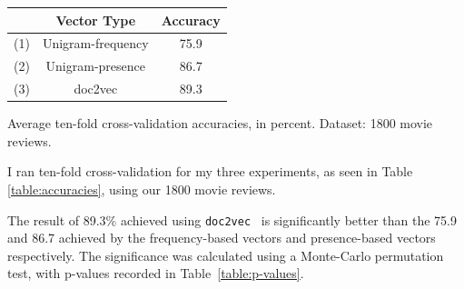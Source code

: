\documentclass[12pt]{article}
\newcommand{\docvec}{\texttt{doc2vec}}
\begin{document}
\begin{multicols}{2}
\begin{tablehere}
\centering
 \begin{tabular}{| c | c | c|} 
 \hline
   & Vector Type & Accuracy \\ [0.5ex] 
 \hline\hline
 (1) & Unigram-frequency & 75.9\\ 
 \hline
 (2) & Unigram-presence & 86.7 \\
 \hline
 (3) & doc2vec & 89.3 \\
 \hline
\end{tabular}
\caption{Average ten-fold cross-validation accuracies, in percent. Dataset: 1800 movie reviews.} \label{table:accuracies}
\end{tablehere}

I ran ten-fold cross-validation for my three experiments, as seen in Table \ref{table:accuracies}, using our 1800 movie reviews.

The result of 89.3\% achieved using \docvec~ is significantly better than the 75.9 and 86.7 achieved by the frequency-based vectors and presence-based vectors respectively. The significance was calculated using a Monte-Carlo permutation test, with p-values recorded in Table~\ref{table:p-values}.


\end{multicols}
\end{document}

